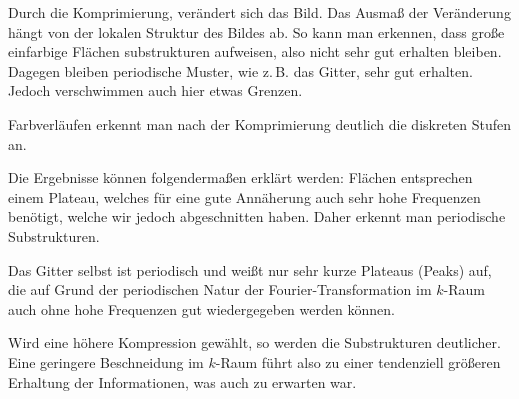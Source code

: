 Durch die Komprimierung, verändert sich das Bild. Das Ausmaß der Veränderung
hängt von der lokalen Struktur des Bildes ab. So kann man erkennen, dass
große einfarbige Flächen substrukturen aufweisen, also nicht sehr gut erhalten
bleiben. Dagegen bleiben periodische Muster, wie z.\,B. das Gitter, sehr gut
erhalten. Jedoch verschwimmen auch hier etwas Grenzen.

Farbverläufen erkennt man nach der Komprimierung deutlich die diskreten Stufen an.

Die Ergebnisse können folgendermaßen erklärt werden: Flächen entsprechen einem Plateau,
welches für eine gute Annäherung auch sehr hohe Frequenzen benötigt, welche wir jedoch
abgeschnitten haben. Daher erkennt man periodische Substrukturen.

Das Gitter selbst ist periodisch und weißt nur sehr kurze Plateaus (Peaks) auf, die auf Grund
der periodischen Natur der Fourier-Transformation im $k$-Raum auch ohne hohe Frequenzen
gut wiedergegeben werden können.

Wird eine höhere Kompression gewählt, so werden die Substrukturen deutlicher.
Eine geringere Beschneidung im $k$-Raum führt also zu einer tendenziell größeren
Erhaltung der Informationen, was auch zu erwarten war.

